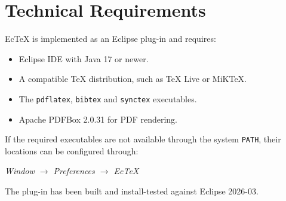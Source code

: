 \section{Technical Requirements}

EcTeX is implemented as an Eclipse plug-in and requires:

\begin{itemize}[noitemsep]
    \item Eclipse IDE with Java 17 or newer.
    \item A compatible TeX distribution, such as TeX Live
    or MiKTeX.
    \item The \texttt{pdflatex}, \texttt{bibtex} and
    \texttt{synctex} executables.
    \item Apache PDFBox 2.0.31 for PDF rendering.
\end{itemize}

If the required executables are not available through
the system \texttt{PATH}, their locations can be
configured through:

\begin{center}
\textit{Window $\rightarrow$ Preferences $\rightarrow$ EcTeX}
\end{center}

The plug-in has been built and install-tested against
Eclipse 2026-03.
